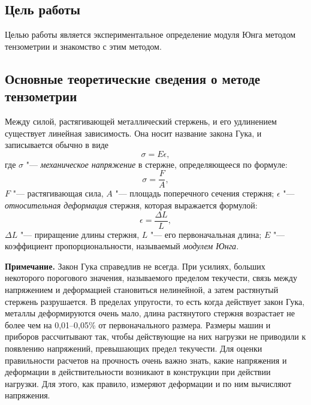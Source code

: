 \documentclass[a4paper, 12pt]{extarticle}
\newcommand{\eps}{\epsilon}
\begin{document}
\MTDTitlePage
\MTDInfoPage

\setcounter{section}{9}

\subsection{Цель работы}
Целью работы является экспериментальное определение модуля Юнга методом тензометрии и знакомство с этим методом. 

\subsection{Основные теоретические сведения о методе тензометрии}
Между силой, растягивающей металлический стержень, и его удлинением существует линейная зависимость. Она носит название закона Гука, и записывается обычно в виде 
\begin{equation}
\label{eq:m9a-hooke's-law}
\sigma = E \eps,
\end{equation}
где $\sigma$ "--- \emph{механическое напряжение} в стержне, определяющееся по формуле:
\begin{equation}
\label{eq:m9a-strain}
\sigma = \frac{F}{A}, %
\end{equation}
$F$ "--- растягивающая сила, $A$ "--- площадь поперечного сечения стержня; $\eps$  "--- \emph{относительная деформация} стержня, которая выражается формулой:
\begin{equation}
\label{eq:m9a-relative-strain}
\eps = \frac{\Delta L}{L},
\end{equation}
$\Delta L$ "--- приращение длины стержня, $L$ "--- его первоначальная длина; $E$ "--- коэффициент пропорциональности, называемый \emph{модулем Юнга}. 

\textbf{Примечание.} Закон Гука справедлив не всегда. При усилиях, больших некоторого порогового значения, называемого пределом текучести, связь между напряжением и деформацией становиться нелинейной, а затем растянутый стержень разрушается. В пределах упругости, то есть когда действует закон Гука, металлы деформируются очень мало,  длина растянутого стержня возрастает не более чем на 0,01--0,05\% от первоначального размера. Размеры машин и приборов рассчитывают так, чтобы действующие на них нагрузки не приводили к появлению напряжений, превышающих предел текучести. Для оценки правильности расчетов на прочность очень важно знать, какие напряжения и деформации в действительности возникают в конструкции при действии нагрузки. Для этого, как правило, измеряют деформации и по ним вычисляют напряжения. 
\end{document}
